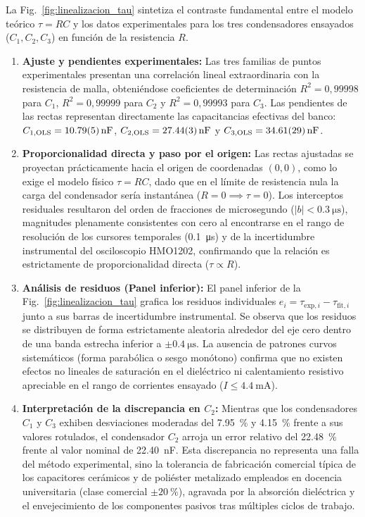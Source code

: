 La Fig.~\ref{fig:linealizacion_tau} sintetiza el contraste fundamental entre el modelo teórico $\tau = RC$ y los datos experimentales para los tres condensadores ensayados ($C_1, C_2, C_3$) en función de la resistencia $R$.

\begin{enumerate}
    \item \textbf{Ajuste y pendientes experimentales:} Las tres familias de puntos experimentales presentan una correlación lineal extraordinaria con la resistencia de malla, obteniéndose coeficientes de determinación $R^2 = 0{,}99998$ para $C_1$, $R^2 = 0{,}99999$ para $C_2$ y $R^2 = 0{,}99993$ para $C_3$. Las pendientes de las rectas representan directamente las capacitancias efectivas del banco: $C_{1,\text{OLS}} = \qty{10,79 \pm 0,05}{\nano\farad}$, $C_{2,\text{OLS}} = \qty{27,44 \pm 0,03}{\nano\farad}$ y $C_{3,\text{OLS}} = \qty{34,61 \pm 0,29}{\nano\farad}$.
    \item \textbf{Proporcionalidad directa y paso por el origen:} Las rectas ajustadas se proyectan prácticamente hacia el origen de coordenadas $(0, 0)$, como lo exige el modelo físico $\tau = RC$, dado que en el límite de resistencia nula la carga del condensador sería instantánea ($R = 0 \implies \tau = 0$). Los interceptos residuales resultaron del orden de fracciones de microsegundo ($|b| < \qty{0,3}{\micro\second}$), magnitudes plenamente consistentes con cero al encontrarse en el rango de resolución de los cursores temporales (\qty{0,1}{\micro\second}) y de la incertidumbre instrumental del osciloscopio HMO1202, confirmando que la relación es estrictamente de proporcionalidad directa ($\tau \propto R$).
    \item \textbf{Análisis de residuos (Panel inferior):} El panel inferior de la Fig.~\ref{fig:linealizacion_tau} grafica los residuos individuales $e_i = \tau_{\text{exp},i} - \tau_{\text{fit},i}$ junto a sus barras de incertidumbre instrumental. Se observa que los residuos se distribuyen de forma estrictamente aleatoria alrededor del eje cero dentro de una banda estrecha inferior a $\pm\qty{0,4}{\micro\second}$. La ausencia de patrones curvos sistemáticos (forma parabólica o sesgo monótono) confirma que no existen efectos no lineales de saturación en el dieléctrico ni calentamiento resistivo apreciable en el rango de corrientes ensayado ($I \le \qty{4,4}{\milli\ampere}$).
    \item \textbf{Interpretación de la discrepancia en $C_2$:} Mientras que los condensadores $C_1$ y $C_3$ exhiben desviaciones moderadas del \qty{+7,95}{\percent} y \qty{+4,15}{\percent} frente a sus valores rotulados, el condensador $C_2$ arroja un error relativo del \qty{+22,48}{\percent} frente al valor nominal de \qty{22,40}{\nano\farad}. Esta discrepancia no representa una falla del método experimental, sino la tolerancia de fabricación comercial típica de los capacitores cerámicos y de poliéster metalizado empleados en docencia universitaria (clase comercial $\pm\qty{20}{\percent}$), agravada por la absorción dieléctrica y el envejecimiento de los componentes pasivos tras múltiples ciclos de trabajo.
\end{enumerate}

